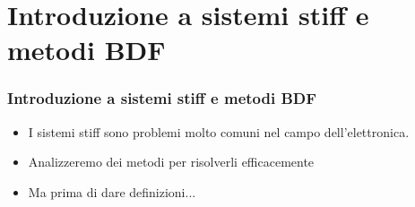 \documentclass[aspectratio=169, 10pt, handout,usenames,dvipsnames]{beamer}
\begin{document}
\section{Introduzione a sistemi stiff e metodi BDF}\label{sec:sec1}
\begin{frame} \frametitle{Introduzione a sistemi stiff e metodi BDF}
    \begin{itemize}
        \item I sistemi stiff sono problemi molto comuni nel campo dell'elettronica. 
        \item Analizzeremo dei metodi per risolverli efficacemente
        \item Ma prima di dare definizioni...
    \end{itemize}
\end{frame}
\end{document}
